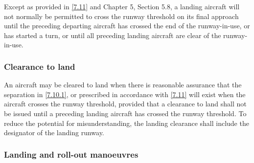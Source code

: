 \documentclass[../main.tex]{subfiles}
\begin{document}
    Except as provided in \ref{7.11} and Chapter 5, Section 5.8, a landing aircraft will not normally be permitted to cross the runway threshold on its final approach until the preceding departing aircraft has crossed the end of the runway-in-use, or has started a turn, or until all preceding landing aircraft are clear of the runway-in-use.




    \subsubsection{Clearance to land}

    An aircraft may be cleared to land when there is reasonable assurance that the separation in \ref{7.10.1}, or prescribed in accordance with \ref{7.11} will exist when the aircraft crosses the runway threshold, provided that a clearance to land shall not be issued until a preceding landing aircraft has crossed the runway threshold. To reduce the potential for misunderstanding, the landing clearance shall include the designator of the landing runway.

    \subsubsection{Landing and roll-out manoeuvres}
\end{document}
